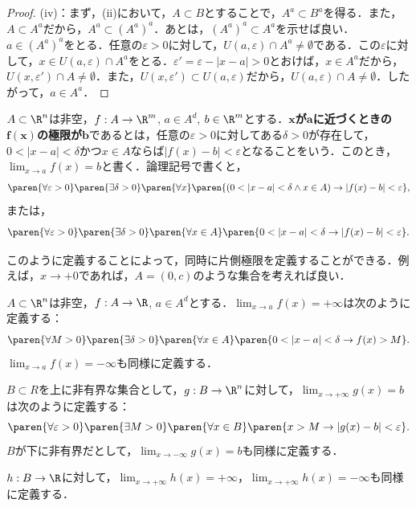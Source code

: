 \documentclass[a4paper,10pt]{ltjsarticle}
\begin{document}
\begin{proof}
  (iv)：まず，(ii)において，\(A \subset B\)とすることで，\(A^a \subset B^a\)を得る．また，\(A \subset A^a\)だから，\(A^a \subset (A^a)^a\)．あとは，\((A^a)^a \subset A^a\)を示せば良い．\(a \in (A^a)^a\)をとる．任意の\(\varepsilon > 0\)に対して，\(U(a, \varepsilon) \cap A^a \ne \emptyset\)である．この\(\varepsilon\)に対して，\(x \in U(a, \varepsilon) \cap A^a\)をとる．\(\varepsilon' = \varepsilon - |x - a| > 0\)とおけば，\(x \in A^a\)だから，\(U(x, \varepsilon') \cap A \ne \emptyset\)．また，\(U(x, \varepsilon') \subset U(a, \varepsilon)\)だから，\(U(a, \varepsilon) \cap A \ne \emptyset\)．したがって，\(a \in A^a\)．
\end{proof}


\begin{MyDefinition}[極限][limit]
  \(A \subset \R^n\)は非空，\(f : A \to \R^m\), \(a \in A^d\), \(b \in \R^m\)とする．\textbf{\(\bm x\)が\(\bm a\)に近づくときの\(\bm {f(x)}\)の極限が\(\bm{b}\)}であるとは，任意の\(\varepsilon > 0\)に対してある\(\delta > 0\)が存在して，\(0 < |x - a| < \delta\)かつ\(x \in A\)ならば\(|f(x) - b| < \varepsilon\)となることをいう．このとき，\(\lim_{x \to a} f(x) = b\)と書く．論理記号で書くと，
  \[ \paren{\forall \varepsilon > 0}\paren{\exists \delta > 0}\paren{\forall x}\paren{(0 < |x - a| < \delta \land x \in A) \to |f(x) - b| < \varepsilon},\]
  または，
  \[ \paren{\forall \varepsilon > 0}\paren{\exists \delta > 0}\paren{\forall x \in A}\paren{0 < |x - a| < \delta \to |f(x) - b| < \varepsilon}.\]
\end{MyDefinition}

このように定義することによって，同時に片側極限を定義することができる．例えば，\(x\to+0\)であれば，\(A = (0, c)\)のような集合を考えれば良い．

\begin{MyDefinition}
  \(A \subset \R^n\)は非空，\(f: A \to \R\), \(a \in A^d\)とする．\(\lim_{x \to a} f(x) = +\infty\)は次のように定義する：
  \[ \paren{\forall M > 0}\paren{\exists \delta > 0}\paren{\forall x \in A}\paren{0 < |x - a| < \delta \to f(x) > M}.\]
  \(\lim_{x \to a} f(x) = -\infty\)も同様に定義する．

  \(B \subset R\)を上に非有界な集合として，\(g: B \to \R^n\)に対して，\(\lim_{x \to +\infty} g(x) = b\)は次のように定義する：
  \[ \paren{\forall \varepsilon > 0}\paren{\exists M > 0}\paren{\forall x \in B}\paren{x > M \to |g(x) - b| < \varepsilon}.\]
  \(B\)が下に非有界だとして，\(\lim_{x \to -\infty} g(x) = b\)も同様に定義する．

  \(h: B \to \R\)に対して，\(\lim_{x \to +\infty} h(x) = +\infty\)，\(\lim_{x \to +\infty} h(x) = -\infty\)も同様に定義する．
\end{MyDefinition}
\end{document}
